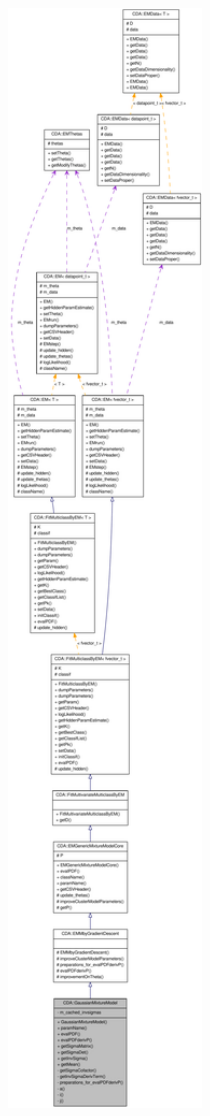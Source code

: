 \begin{figure}[H]
\begin{center}
\leavevmode
\includegraphics[width=400pt]{classCDA_1_1GaussianMixtureModel__coll__graph}
\end{center}
\end{figure}
